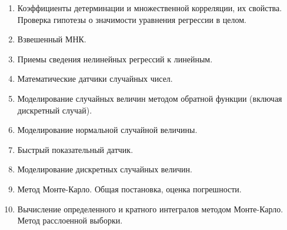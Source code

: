 \begin{enumerate}
    \item Коэффициенты детерминации и множественной корреляции, их свойства. Проверка гипотезы о значимости уравнения регрессии в целом.
    \item Взвешенный МНК.
    \item Приемы сведения нелинейных регрессий к линейным.
    \item Математические датчики случайных чисел.
    \item Моделирование случайных величин методом обратной функции (включая дискретный случай).
    \item Моделирование нормальной случайной величины.
    \item Быстрый показательный датчик.
    \item Моделирование дискретных случайных величин.
    \item Метод Монте-Карло. Общая постановка, оценка погрешности.
    \item Вычисление определенного и кратного интегралов методом Монте-Карло. Метод расслоенной выборки.
\end{enumerate}
